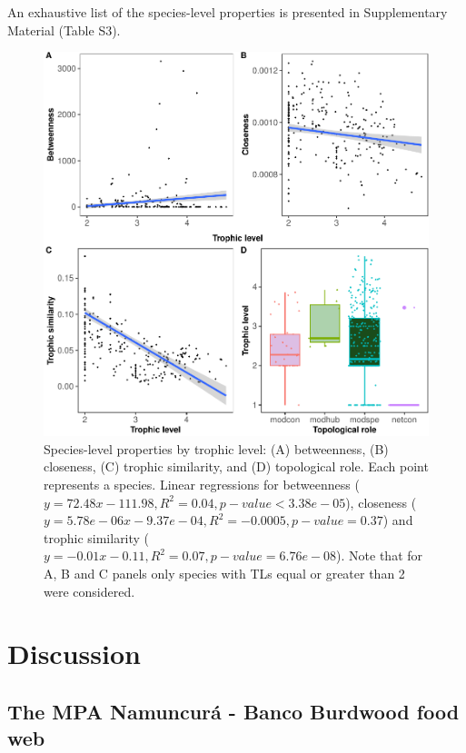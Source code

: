 \documentclass[preprint, 3p,
authoryear]{elsarticle} %
\begin{document}
An exhaustive list of the species-level properties is presented in
Supplementary Material (Table S3).

\begin{figure}

{\centering \includegraphics{MS_Burdwood_foodweb_files/figure-latex/figure4-1} 

}

\caption{Species-level properties by trophic level: (A) betweenness, (B) closeness, (C) trophic similarity, and (D) topological role. Each point represents a species. Linear regressions for betweenness ($y = 72.48x - 111.98, R^2 = 0.04, p-value < 3.38e-05$), closeness ($y = 5.78e-06x - 9.37e-04, R^2 = -0.0005, p-value = 0.37$) and trophic similarity ($y = -0.01x - 0.11, R^2 = 0.07, p-value = 6.76e-08$). Note that for A, B and C panels only species with TLs equal or greater than 2 were considered.}\label{fig:figure4}
\end{figure}

\hypertarget{discussion}{%
\section{Discussion}\label{discussion}}

\hypertarget{the-mpa-namuncuruxe1---banco-burdwood-food-web}{%
\subsection{The MPA Namuncurá - Banco Burdwood food
web}\label{the-mpa-namuncuruxe1---banco-burdwood-food-web}}
\end{document}

